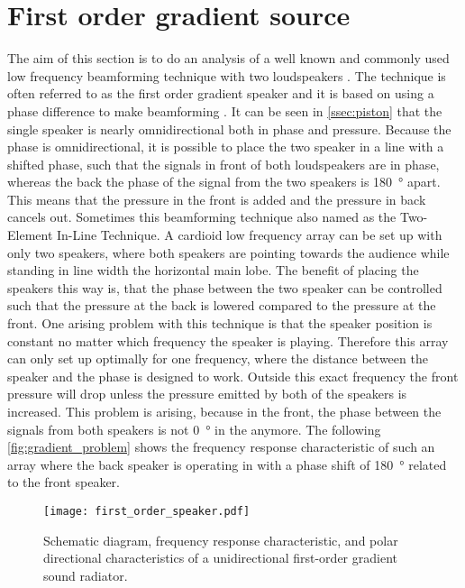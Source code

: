 \section{First order gradient source}\label{sec:first_order_speaker}
The aim of this section is to do an analysis of a well known and commonly used low frequency beamforming technique with two loudspeakers \citep{McCarthy2016}. The technique is often referred to as the first order gradient speaker and it is based on using a phase difference to make beamforming \citep{olson1973gradient}.
It can be seen in \autoref{ssec:piston} that the single speaker is nearly omnidirectional both in phase and pressure. Because the phase is omnidirectional, it is possible to place the two speaker in a line with a shifted phase, such that the signals in front of both loudspeakers are in phase, whereas the back the phase of the signal from the two speakers is \SI{180}{\degree} apart. This means that the pressure in the front is added and the pressure in back cancels out. Sometimes this beamforming technique also named as the Two-Element In-Line Technique. A cardioid low frequency array can be set up with only two speakers, where both speakers are pointing towards the audience while standing in line width the horizontal main lobe. The benefit of placing the speakers this way is, that the phase between the two speaker can be controlled such that the pressure at the back is lowered compared to the pressure at the front. One arising problem with this technique is that the speaker position is constant no matter which frequency the speaker is playing. Therefore this array can only set up optimally for one frequency, where the distance between the speaker and the phase is designed to work. Outside this exact frequency the front pressure will drop unless the pressure emitted by both of the speakers is increased. This problem is arising, because in the front, the phase between the signals from both speakers is not \SI{0}{\degree} in the anymore. The following \autoref{fig:gradient_problem} shows the frequency response characteristic of such an array where the back speaker is operating in with a phase shift of \SI{180}{\degree} related to the front speaker.

\begin{figure}[H]
	\centering
	\texttt{[image: first\_order\_speaker.pdf]}
	\caption{Schematic diagram, frequency response characteristic, and polar directional characteristics of a unidirectional first-order gradient sound radiator. \citep{olson1973gradient}}
		\label{fig:gradient_problem}
\end{figure}

